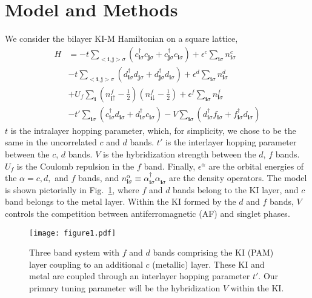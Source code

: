 \documentclass[pra,letterpaper,10pt,twocolumn]{revtex4}
\begin{document}
\section{Model and Methods}
We consider the bilayer KI-M Hamiltonian on a square lattice,
\begin{align}
H &= -t \sum_{<\textbf{i},\textbf{j}>\sigma}(c^{\dagger}_{\textbf{i}\sigma}c^{\phantom{\dagger}}_{\textbf{j}\sigma}+
c^{\dagger}_{\textbf{j}\sigma}c^{\phantom{\dagger}}_{\textbf{i}\sigma})
+\epsilon^c\sum_{\textbf{i}\sigma}n^c_{\textbf{i}\sigma} \nonumber \\
& -t\sum_{<\textbf{i},\textbf{j}>\sigma}(d^{\dagger}_{\textbf{i}\sigma}d^{\phantom{\dagger}}_{\textbf{j}\sigma}
+d^{\dagger}_{\textbf{j}\sigma}
d^{\phantom{\dagger}}_{\textbf{i}\sigma})+\epsilon^d\sum_{\textbf{i}\sigma}
n^d_{\textbf{i}\sigma} \nonumber \\
& +U_f\sum_{\textbf{i}}(n^f_{\textbf{i}\uparrow}-\frac{1}{2})(n^f_{\textbf{i}\downarrow}-\frac{1}{2}) +\epsilon^f\sum_{\textbf{i}\sigma}n^f_{\textbf{i}\sigma} \nonumber \\
& -t'\sum_{\textbf{i}\sigma}(c^{\dagger}_{\textbf{i}\sigma}d^{\phantom{\dagger}}_{\textbf{i}\sigma}
+d^{\dagger}_{\textbf{i}\sigma}
c^{\phantom{\dagger}}_{\textbf{i}\sigma})-V\sum_{\textbf{i}\sigma}(d^{\dagger}_{\textbf{i}\sigma}f^{\phantom{\dagger}}_{\textbf{i}\sigma}
+f^{\dagger}_{\textbf{i}\sigma}d^{\phantom{\dagger}}_{\textbf{i}\sigma})
\label{eq:ham}
\end{align}
$t$ is the intralayer 
hopping parameter, which, for simplicity, we chose to be the
same in the uncorrelated $c$ and $d$ bands. $t'$ is the interlayer
hopping parameter between the $c$, $d$ bands. $V$ is the hybridization
strength between the $d$, $f$ bands. $U_f$ is the Coulomb repulsion in
the $f$ band.  Finally, $\epsilon^\alpha$ are the orbital energies of the
$\alpha=c, d,$ and $f$ bands, and $n^\alpha_{\textbf{i}\sigma}\equiv
\alpha^{\dagger}_{\textbf{i}\sigma}
\alpha^{\phantom{\dagger}}_{\textbf{i}\sigma}$ are the density
operators. The model is shown pictorially in Fig.~\ref{fig:geometry},
where $f$ and $d$ bands belong to the KI layer, and $c$ band belongs to
the metal layer. 
Within the KI formed by the $d$ and $f$ bands, $V$ controls the
competition between antiferromagnetic (AF) and singlet phases.  


\begin{figure}[!h]
\texttt{[image: figure1.pdf]} 
\caption{
Three band system with $f$ and $d$ bands comprising the KI (PAM) layer
coupling to an additional $c$ (metallic) layer.  These KI and metal are
coupled through an interlayer hopping parameter $t'$.  Our primary
tuning parameter will be the hybridization $V$ within the KI.
\label{fig:geometry}
}
\end{figure}
\end{document}
